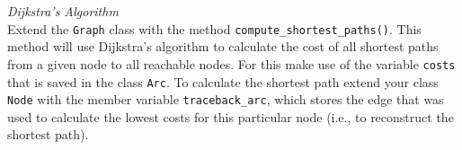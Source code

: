   \textit{Dijkstra's Algorithm}\\
Extend the \texttt{Graph} class with the method \texttt{compute\_shortest\_paths()}.
This method will use Dijkstra's algorithm to calculate the cost of all shortest paths from a given node to all reachable nodes.
For this make use of the variable \texttt{costs} that is saved in the class \texttt{Arc}.
To calculate the shortest path extend your class \texttt{Node} with the member variable \texttt{traceback\_arc}, which stores the edge that was used to calculate the lowest costs for this particular node (i.e., to reconstruct the shortest path).
